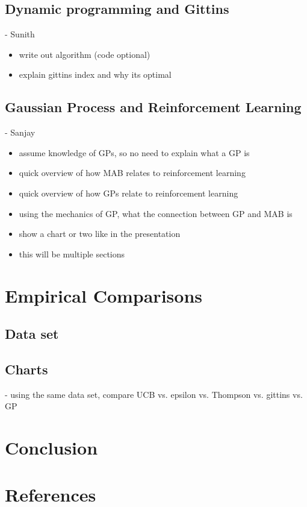 \documentclass{article}
\begin{document}
\subsection{Dynamic programming and Gittins}

- Sunith
\begin{itemize}
\item write out algorithm (code optional)
\item explain gittins index and why its optimal
\end{itemize}

\subsection{Gaussian Process and Reinforcement Learning}

- Sanjay
\begin{itemize}
\item assume knowledge of GPs, so no need to explain what a GP is
\item quick overview of how MAB relates to reinforcement learning
\item quick overview of how GPs relate to reinforcement learning
\item using the mechanics of GP, what the connection between GP and MAB is
\item show a chart or two like in the presentation
\item this will be multiple sections
\end{itemize}

\section{Empirical Comparisons}

\subsection{Data set}

\subsection{Charts}

- using the same data set, compare UCB vs. epsilon vs. Thompson vs. gittins vs. GP

\section{Conclusion}

\section{References}
\end{document}
